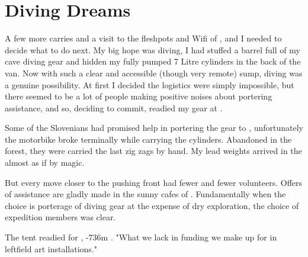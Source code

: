 \section{Diving Dreams}

A few more carries and a visit to the fleshpots and Wifi of , and
I needed to decide what to do next. My big hope was diving, I had
stuffed a barrel full of my cave diving gear and hidden my fully pumped
7 Litre cylinders in the back of the van. Now with such a clear and
accessible (though very remote) sump, diving was a genuine possibility.
At first I decided the logistics were simply impossible, but there
seemed to be a lot of people making positive noises about portering
assistance, and so, deciding to commit, readied my gear at .

Some of the Slovenians had promised help in portering the gear to ,
unfortunately the motorbike broke terminally while carrying the
cylinders. Abandoned in the forest, they were carried the last zig zags
by hand. My lead weights arrived in the  almost as if by magic.

But every move closer to the pushing front had fewer and fewer
volunteers. Offers of assistance are gladly made in the sunny cafes of
. Fundamentally when the choice is porterage of diving gear at the
expense of dry exploration, the choice of expedition members was clear.

\begin{marginfigure}
\checkoddpage \ifoddpage \forcerectofloat \else \forceversofloat \fi
\centering
 \caption{The tent readied for , -736m . "What we lack in funding we make up for in leftfield art installations." }
 \label{red cow tent}
\end{marginfigure}


